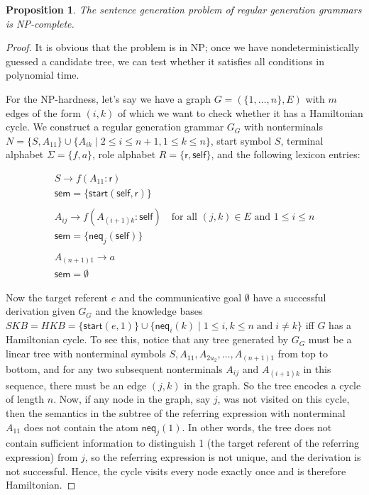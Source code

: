 \documentclass[11pt,a4]{article}
\newcommand{\self}{\mathsf{self}}
\newcommand{\Neq}{{:}}
\theoremstyle{plain}
\newtheorem{prop}[theorem]{Proposition}
\theoremstyle{definition}
\begin{document}
\begin{prop} \label{prop:npc} The sentence generation problem of
  regular generation grammars is NP-complete.
\end{prop}
\begin{proof}
  It is obvious that the problem is in NP; once we have
  nondeterministically guessed a candidate tree, we can test whether
  it satisfies all conditions in polynomial time.

  For the NP-hardness, let's say we have a graph $G =
  (\{1,\ldots,n\},E)$ with $m$ edges of the form $(i,k)$ of which we
  want to check whether it has a Hamiltonian cycle.  We construct a
  regular generation grammar $G_G$ with nonterminals $N = \{S,
  A_{11}\} \cup \{A_{ik} \;|\; 2 \leq i \leq n+1, 1 \leq k \leq n\}$,
  start symbol $S$, terminal alphabet $\Sigma=\{f,a\}$, role alphabet
  $R = \{\mathsf{r}, \self\}$, and the following lexicon entries:

  $$\begin{array}{l}
    S \rightarrow f(A_{11} \Neq \mathsf{r}) \\
    \mathsf{sem} = \{ \mathsf{start}(\self,\mathsf{r})\} \\
    \\
    A_{ij} \rightarrow f(A_{(i+1)k} \Neq \self) \quad \mbox{for all
      $(j,k) \in E$ and $1 \leq i \leq n$} \\ 
    \mathsf{sem} = \{ \mathsf{neq}_j(\self) \} \\
    \\
    A_{(n+1)1} \rightarrow a \\
    \mathsf{sem} = \emptyset
  \end{array}
  $$

  Now the target referent $e$ and the communicative goal $\emptyset$
  have a successful derivation given $G_G$ and the knowledge bases
  $SKB = HKB = \{\mathsf{start}(e,1)\} \cup \{ \mathsf{neq}_i(k) \;|\;
  1 \leq i,k \leq n \;\mbox{and}\; i \neq k \}$ iff $G$ has a
  Hamiltonian cycle.  To see this, notice that any tree generated by
  $G_G$ must be a linear tree with nonterminal symbols $S, A_{11},
  A_{2u_2}, \ldots, A_{(n+1)1}$ from top to bottom, and for any two
  subsequent nonterminals $A_{ij}$ and $A_{(i+1)k}$ in this sequence,
  there must be an edge $(j,k)$ in the graph.  So the tree encodes a
  cycle of length $n$.  Now, if any node in the graph, say $j$, was
  not visited on this cycle, then the semantics in the subtree of the
  referring expression with nonterminal $A_{11}$ does not contain the
  atom $\mathsf{neq}_j(1)$.  In other words, the tree does not contain
  sufficient information to distinguish 1 (the target referent of the
  referring expression) from $j$, so the referring expression is not
  unique, and the derivation is not successful.  Hence, the cycle
  visits every node exactly once and is therefore Hamiltonian.
\end{proof}
\end{document}
